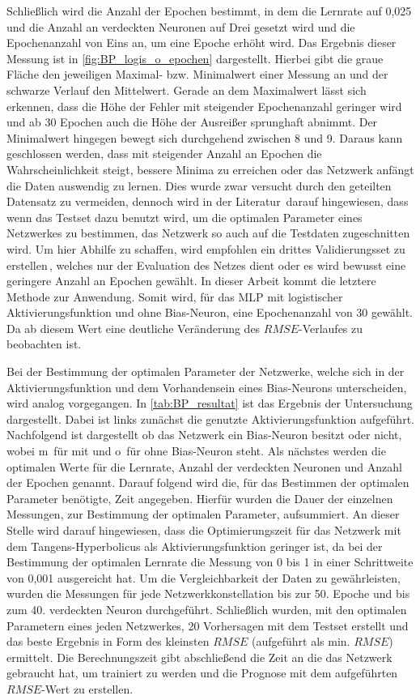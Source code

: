 Schließlich wird die Anzahl der Epochen bestimmt, in dem die Lernrate auf 0,025 und die Anzahl an verdeckten Neuronen auf Drei gesetzt wird und die Epochenanzahl von Eins an, um eine Epoche erhöht wird. Das Ergebnis dieser Messung ist in \autoref{fig:BP_logis_o_epochen} dargestellt. Hierbei gibt die graue Fläche den jeweiligen Maximal- bzw. Minimalwert einer Messung an und der schwarze Verlauf den Mittelwert. Gerade an dem Maximalwert lässt sich erkennen, dass die Höhe der Fehler mit steigender Epochenanzahl geringer wird und ab 30 Epochen auch die Höhe der Ausreißer sprunghaft abnimmt. Der Minimalwert hingegen bewegt sich durchgehend zwischen 8 und 9. Daraus kann geschlossen werden, dass mit steigender Anzahl an Epochen die Wahrscheinlichkeit steigt, bessere Minima zu erreichen oder das Netzwerk anfängt die Daten auswendig zu lernen. Dies wurde zwar versucht durch den geteilten Datensatz zu vermeiden, dennoch wird in der Literatur\, darauf hingewiesen, dass wenn das Testset dazu benutzt wird, um die optimalen Parameter eines Netzwerkes zu bestimmen, das Netzwerk so auch auf die Testdaten zugeschnitten wird. Um hier Abhilfe zu schaffen, wird empfohlen ein drittes Validierungsset zu erstellen\,, welches nur der Evaluation des Netzes dient oder es wird bewusst eine geringere Anzahl an Epochen gewählt. In dieser Arbeit kommt die letztere Methode zur Anwendung. Somit wird, für das MLP mit logistischer Aktivierungsfunktion und ohne Bias-Neuron, eine Epochenanzahl von 30 gewählt. Da ab diesem Wert eine deutliche Veränderung des $RMSE$-Verlaufes zu beobachten ist.

Bei der Bestimmung der optimalen Parameter der Netzwerke, welche sich in der Aktivierungsfunktion und dem Vorhandensein eines Bias-Neurons unterscheiden, wird analog vorgegangen.
In \autoref{tab:BP_resultat} ist das Ergebnis der Untersuchung dargestellt. Dabei ist links zunächst die genutzte Aktivierungsfunktion aufgeführt. Nachfolgend ist dargestellt ob das Netzwerk ein Bias-Neuron besitzt oder nicht, wobei \glqq m\grqq~für mit und \glqq o\grqq~für ohne Bias-Neuron steht. Als nächstes werden die optimalen Werte für die Lernrate, Anzahl der verdeckten Neuronen und Anzahl der Epochen genannt. Darauf folgend wird die, für das Bestimmen der optimalen Parameter benötigte, Zeit angegeben. Hierfür wurden die Dauer der einzelnen Messungen, zur Bestimmung der optimalen Parameter, aufsummiert. An dieser Stelle wird darauf hingewiesen, dass die Optimierungszeit für das Netzwerk mit dem Tangens-Hyperbolicus als Aktivierungsfunktion geringer ist, da bei der Bestimmung der optimalen Lernrate die Messung von 0 bis 1 in einer Schrittweite von 0,001 ausgereicht hat. Um die Vergleichbarkeit der Daten zu gewährleisten, wurden die Messungen für jede Netzwerkkonstellation bis zur 50. Epoche und bis zum 40. verdeckten Neuron durchgeführt. Schließlich wurden, mit den optimalen Parametern eines jeden Netzwerkes, 20 Vorhersagen mit dem Testset erstellt und das beste Ergebnis in Form des kleinsten $RMSE$ (aufgeführt als min. $RMSE$) ermittelt. Die Berechnungszeit gibt abschließend die Zeit an die das Netzwerk gebraucht hat, um trainiert zu werden und die Prognose mit dem aufgeführten $RMSE$-Wert zu erstellen. 


